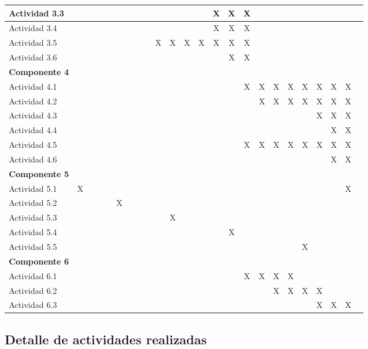 \documentclass[]{article}
\begin{document}
\begin{table}[!htb]
{\begin{tabular}{|l|c|c|c|c|c|c|c|c|c|c|c|c|c|c|c|c|c|c|c|c|c|c|c|}
    Actividad 3.3 & & & & & & & & & & & & & X & X & X & & & & & & & \\ \hline
    Actividad 3.4 & & & & & & & & & & & & & X & X & X & & & & & & & \\ \hline
    Actividad 3.5 & & & & & & & & & X & X & X & X & X & X & X & & & & & & & \\ \hline
    Actividad 3.6 & & & & & & & & & & & & & & X & X & & & & & & & \\ \hline
    \textbf{Componente 4} & \multicolumn{22}{|l|}{}\\ \hline
    Actividad 4.1 & & & & & & & & & & & & & & & X & X & X & X & X & X & X & X\\ \hline
    Actividad 4.2 & & & & & & & & & & & & & & & & X & X & X & X & X & X & X\\ \hline
    Actividad 4.3 & & & & & & & & & & & & & & & & & & & & X & X & X \\ \hline
    Actividad 4.4 & & & & & & & & & & & & & & & & & & & & & X & X\\ \hline
    Actividad 4.5 & & & & & & & & & & & & & & & X & X & X & X & X & X & X & X\\ \hline
    Actividad 4.6 & & & & & & & & & & & & & & & & & & & & & X & X\\ \hline
    \textbf{Componente 5} & \multicolumn{22}{|l|}{}\\ \hline
    Actividad 5.1 & X & & & & & & & & & & & & & & & & & & & & & X\\ \hline
    Actividad 5.2 & & & & & X & & & & & & & & & & & & & & & & & \\ \hline
    Actividad 5.3 & & & & & & & & & & X & & & & & & & & & & & & \\ \hline
    Actividad 5.4 & & & & & & & & & & & & & & X & & & & & & & & \\ \hline
    Actividad 5.5 & & & & & & & & & & & & & & & & & & & X & & & \\ \hline
    \textbf{Componente 6} & \multicolumn{22}{|l|}{}\\ \hline
    Actividad 6.1 & & & & & & & & & & & & & & & X & X & X & X & & & & \\ \hline
    Actividad 6.2 & & & & & & & & & & & & & & & & & X & X & X & X & & \\ \hline
    Actividad 6.3 & & & & & & & & & & & & & & & & & & & & X & X & X\\ \hline
\end{tabular}
}
\end{table}

\clearpage
\subsection{Detalle de actividades realizadas}
\end{document}
